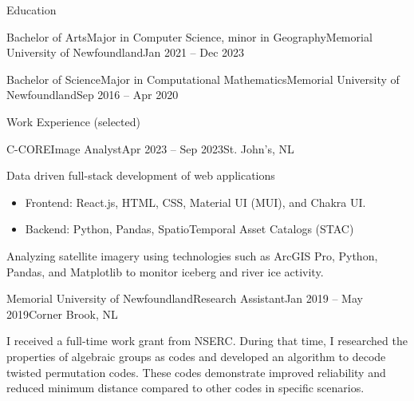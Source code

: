 \documentclass[]{Keenan-Nicholson-Resume}
\begin{document}
\resumeheader
{}
{}
{}
{}
{}

\begin{section}{Education}
    \begin{subsection}{Bachelor of Arts}{Major in Computer Science, minor in Geography}{Memorial University of Newfoundland}{Jan 2021 -- Dec 2023}
    \end{subsection}
    \begin{subsection}{Bachelor of Science}{Major in Computational Mathematics}{Memorial University of Newfoundland}{Sep 2016 -- Apr 2020}
    \end{subsection}
\end{section}

\begin{section}{Work Experience (selected)}
    \begin{subsection}{C-CORE}{Image Analyst}{Apr 2023 -- Sep 2023}{St. John's, NL}
        \item Data driven full-stack development of web applications
        \vspace{-4pt}
            \begin{itemize}[itemsep=-6.5pt]
                \item Frontend: React.js, HTML, CSS, Material UI (MUI), and Chakra UI.
                \item Backend: Python, Pandas, SpatioTemporal Asset Catalogs (STAC)
            \end{itemize}
        \vspace{1pt}
        \item Analyzing satellite imagery using technologies such as ArcGIS Pro, Python, Pandas, and Matplotlib to \newline monitor iceberg and river ice activity.
    \end{subsection}

    \begin{subsection}{Memorial University of Newfoundland}{Research Assistant}{Jan 2019 -- May 2019}{Corner Brook, NL}
        \item I received a full-time work grant from NSERC. During that time, I researched the properties of algebraic groups as codes and developed an algorithm to decode twisted permutation codes. These codes demonstrate improved reliability and reduced minimum distance compared to other codes in specific scenarios.
    \end{subsection}
\end{section}
\end{document}
